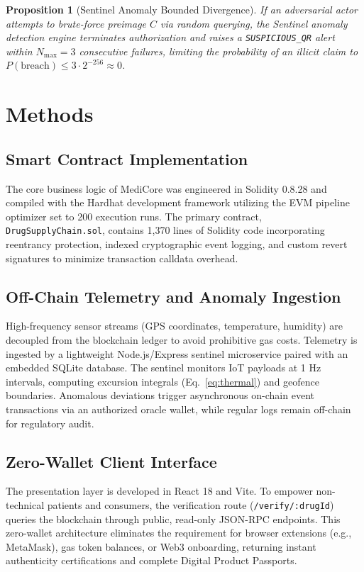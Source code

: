 \documentclass[pdflatex,sn-mathphys-num]{sn-jnl}
\theoremstyle{thmstyleone}
\newtheorem{proposition}[theorem]{Proposition}
\theoremstyle{thmstyletwo}
\theoremstyle{thmstylethree}
\begin{document}
\begin{proposition}[Sentinel Anomaly Bounded Divergence]\label{prop:sentinel}
If an adversarial actor attempts to brute-force preimage $C$ via random querying, the Sentinel anomaly detection engine terminates authorization and raises a \texttt{SUSPICIOUS\_QR} alert within $N_{\text{max}} = 3$ consecutive failures, limiting the probability of an illicit claim to $P(\text{breach}) \le 3 \cdot 2^{-256} \approx 0$.
\end{proposition}

\section{Methods}\label{sec10}

\subsection{Smart Contract Implementation}\label{sec10.1}
The core business logic of MediCore was engineered in Solidity 0.8.28 and compiled with the Hardhat development framework utilizing the EVM pipeline optimizer set to 200 execution runs. The primary contract, \texttt{DrugSupplyChain.sol}, contains 1,370 lines of Solidity code incorporating reentrancy protection, indexed cryptographic event logging, and custom revert signatures to minimize transaction calldata overhead.

\subsection{Off-Chain Telemetry and Anomaly Ingestion}\label{sec10.2}
High-frequency sensor streams (GPS coordinates, temperature, humidity) are decoupled from the blockchain ledger to avoid prohibitive gas costs. Telemetry is ingested by a lightweight Node.js/Express sentinel microservice paired with an embedded SQLite database. The sentinel monitors IoT payloads at 1 Hz intervals, computing excursion integrals (Eq.~\ref{eq:thermal}) and geofence boundaries. Anomalous deviations trigger asynchronous on-chain event transactions via an authorized oracle wallet, while regular logs remain off-chain for regulatory audit.

\subsection{Zero-Wallet Client Interface}\label{sec10.3}
The presentation layer is developed in React 18 and Vite. To empower non-technical patients and consumers, the verification route (\texttt{/verify/:drugId}) queries the blockchain through public, read-only JSON-RPC endpoints. This zero-wallet architecture eliminates the requirement for browser extensions (e.g., MetaMask), gas token balances, or Web3 onboarding, returning instant authenticity certifications and complete Digital Product Passports.
\end{document}
